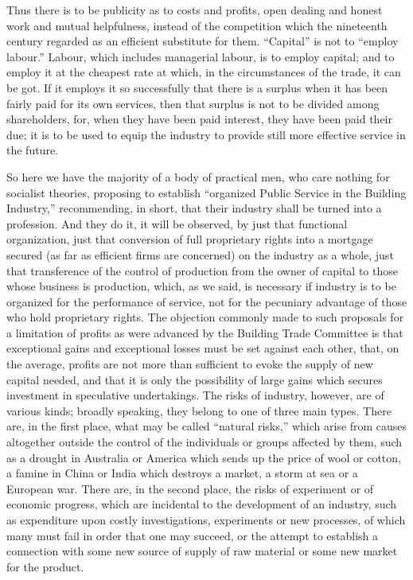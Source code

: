 \documentclass{book}
\begin{document}
Thus there is to be publicity as to costs and profits, open dealing and honest work and mutual helpfulness, instead of the competition which the nineteenth century regarded as an efficient substitute for them. “Capital” is not to “employ labour.” Labour, which includes managerial labour, is to employ capital; and to employ it at the cheapest rate at which, in the circumstances of the trade, it can be got. If it employs it so successfully that there is a surplus when it has been fairly paid for its own services, then that surplus is not to be divided among shareholders, for, when they have been paid interest, they have been paid their due; it is to be used to equip the industry to provide still more effective service in the future.

So here we have the majority of a body of practical men, who care nothing for socialist theories, proposing to establish “organized Public Service in the Building Industry,” recommending, in short, that their industry shall be turned into a profession. And they do it, it will be observed, by just that functional organization, just that conversion of full proprietary rights into a mortgage secured (as far as efficient firms are concerned) on the industry as a whole, just that transference of the control of production from the owner of capital to those whose business is production, which, as we said, is necessary if industry is to be organized for the performance of service, not for the pecuniary advantage of those who hold proprietary rights. The objection commonly made to such proposals for a limitation of profits as were advanced by the Building Trade Committee is that exceptional gains and exceptional losses must be set against each other, that, on the average, profits are not more than sufficient to evoke the supply of new capital needed, and that it is only the possibility of large gains which secures investment in speculative undertakings. The risks of industry, however, are of various kinds; broadly speaking, they belong to one of three main types. There are, in the first place, what may be called “natural risks,” which arise from causes altogether outside the control of the individuals or groups affected by them, such as a drought in Australia or America which sends up the price of wool or cotton, a famine in China or India which destroys a market, a storm at sea or a European war. There are, in the second place, the risks of experiment or of economic progress, which are incidental to the development of an industry, such as expenditure upon costly investigations, experiments or new processes, of which many must fail in order that one may succeed, or the attempt to establish a connection with some new source of supply of raw material or some new market for the product.
\end{document}
